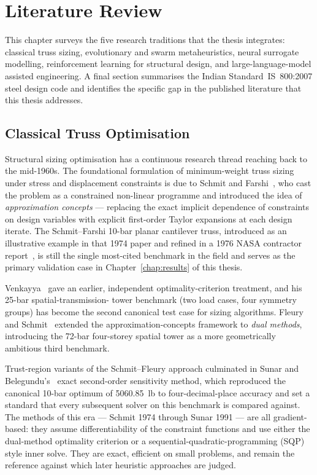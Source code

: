 \chapter{Literature Review}
\label{chap:literature}

This chapter surveys the five research traditions that the thesis
integrates: classical truss sizing, evolutionary and swarm
metaheuristics, neural surrogate modelling, reinforcement learning
for structural design, and large-language-model assisted engineering.
A final section summarises the Indian Standard~IS~800:2007 steel
design code and identifies the specific gap in the published
literature that this thesis addresses.

\section{Classical Truss Optimisation}
\label{sec:lit:classical}

Structural sizing optimisation has a continuous research
thread reaching back to the mid-1960s. The foundational
formulation of minimum-weight truss sizing under stress and
displacement constraints is due to Schmit and
Farshi~\cite{schmit1974}, who cast the problem as a constrained
non-linear programme and introduced the idea of
\emph{approximation concepts} --- replacing the exact implicit
dependence of constraints on design variables with explicit
first-order Taylor expansions at each design iterate. The
Schmit--Farshi 10-bar planar cantilever truss, introduced as an
illustrative example in that 1974 paper and refined in a 1976 NASA
contractor report~\cite{schmit1976}, is still the single most-cited
benchmark in the field and serves as the primary validation case in
Chapter~\ref{chap:results} of this thesis.

Venkayya~\cite{venkayya1971} gave an earlier, independent
optimality-criterion treatment, and his 25-bar spatial-transmission-
tower benchmark (two load cases, four symmetry groups) has become
the second canonical test case for sizing algorithms. Fleury and
Schmit~\cite{fleury1980} extended the approximation-concepts
framework to \emph{dual methods}, introducing the 72-bar
four-storey spatial tower as a more geometrically ambitious third
benchmark.

Trust-region variants of the Schmit--Fleury approach culminated in
Sunar and Belegundu's~\cite{sunar1991} exact second-order sensitivity
method, which reproduced the canonical 10-bar optimum of
\num{5060.85}~lb to four-decimal-place accuracy and set a standard
that every subsequent solver on this benchmark is compared against.
The methods of this era --- Schmit 1974 through Sunar 1991 --- are
all gradient-based: they assume differentiability of the constraint
functions and use either the dual-method optimality criterion or a
sequential-quadratic-programming (SQP) style inner solve. They are
exact, efficient on small problems, and remain the reference against
which later heuristic approaches are judged.

